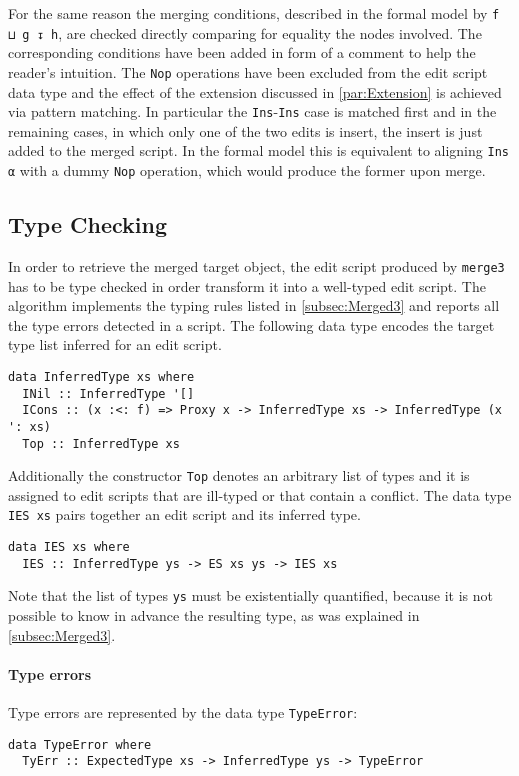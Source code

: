 \documentclass[../Thesis.tex]{subfiles}
\begin{document}
	For the same reason the merging conditions, described in the formal 
	model by \texttt{f ⊔ g ↧ h}, are checked directly
	comparing for equality the nodes involved. The corresponding conditions
	have been added in form of a comment to help the reader's intuition.
	The \texttt{Nop} operations have been excluded from the edit
	script data type and the effect of the extension discussed in 
	\ref{par:Extension} is achieved via pattern matching.
	In particular the \texttt{Ins}-\texttt{Ins} case is matched first and
	in the remaining cases, in which only one of the two edits is insert,
	the insert is just added to the merged script. 
	In the formal model this is equivalent to aligning \texttt{Ins α} with
	a dummy \texttt{Nop} operation, which would produce the former upon 
	merge.
	
	\subsection{Type Checking}
	\label{subsec:TyCheck}
	In order to retrieve the merged target object, the edit script 
	produced by \texttt{merge3} has to be type checked in order transform it 
	into a well-typed edit script.
	The algorithm implements the typing rules listed in \ref{subsec:Merged3}
	and reports all the type errors detected in a script.
	The following data type encodes the target type list 
	inferred for an edit script.
	
\begin{verbatim}
data InferredType xs where
  INil :: InferredType '[]
  ICons :: (x :<: f) => Proxy x -> InferredType xs -> InferredType (x ': xs)
  Top :: InferredType xs
\end{verbatim}	
	Additionally the constructor \texttt{Top} denotes an arbitrary list of types
	and it is assigned to edit scripts that are ill-typed or that contain a conflict.
	The data type \texttt{IES xs} pairs together an edit script and its inferred 
	type.
\begin{verbatim}
data IES xs where
  IES :: InferredType ys -> ES xs ys -> IES xs
\end{verbatim}
	 Note that the list of types \texttt{ys} must be existentially quantified,
	 because it is not possible to know in advance the resulting type, as was 
	 explained in \ref{subsec:Merged3}.
	
	\paragraph{Type errors}
	Type errors are represented by the data type \texttt{TypeError}:
\begin{verbatim}
data TypeError where
  TyErr :: ExpectedType xs -> InferredType ys -> TypeError
\end{verbatim}
	
\end{document}
